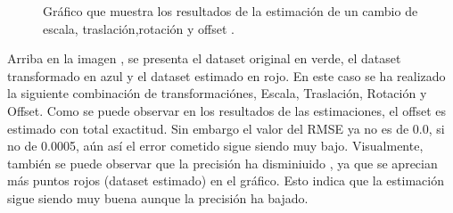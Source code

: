 \begin{figure}[H]
\begin{center}
\hspace{0.5cm}

\end{center}

\caption{Gráfico que muestra los resultados de la estimación de un cambio de escala, traslación,rotación y offset .}
\end{figure}

Arriba en la imagen , se presenta el dataset original en verde, el dataset transformado en azul y el dataset estimado en rojo.
En este caso se ha realizado la siguiente combinación de transformaciónes, Escala, Traslación, Rotación y Offset.
Como se puede observar en los resultados de las estimaciones, el offset es estimado con total exactitud. Sin embargo el valor del RMSE ya no es de 0.0, si no de 0.0005, aún así el error cometido sigue siendo muy bajo.
Visualmente, también se puede observar que la precisión ha disminiuido , ya que se aprecian más puntos rojos (dataset estimado) en el gráfico. Esto indica que la estimación sigue siendo muy buena aunque la precisión ha bajado.


